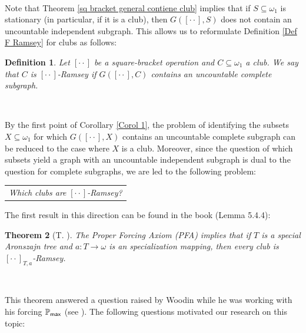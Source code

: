 \documentclass{article}
\newtheorem{theorem}{Theorem}
\newtheorem{definition}[theorem]{Definition}
\begin{document}
\qquad\qquad\qquad\ \ \ 

Note that Theorem \ref{sq bracket general contiene club} implies that if
$S\subseteq\omega_{1}$ is stationary (in particular, if it is a club), then
$G([\cdot\cdot],S)$ does not contain an uncountable independent subgraph. This
allows us to reformulate Definition \ref{Def F Ramsey} for clubs as follows:

\begin{definition}
Let $[\cdot\cdot]$ be a square-bracket operation and $C\subseteq\omega_{1}$ a
club. We say that $C$ is $[\cdot\cdot]$\emph{-Ramsey }if $G([\cdot\cdot],C)$
contains an uncountable complete subgraph.
\end{definition}

\qquad\qquad\qquad\ \ \ \ \qquad\ \ \ 

By the first point of Corollary \ref{Corol 1}, the problem of identifying the
subsets $X\subseteq\omega_{1}$ for which $G([\cdot\cdot],X)$ contains an
uncountable complete subgraph can be reduced to the case where $X$ is a club.
Moreover, since the question of which subsets yield a graph with an
uncountable independent subgraph is dual to the question for complete
subgraphs, we are led to the following problem:\newline

\begin{center}%
\begin{tabular}
[c]{l}%
\emph{Which clubs are}\textit{ }$[\cdot\cdot]$\emph{-Ramsey?}%
\end{tabular}



\end{center}

The first result in this direction can be found in the book \cite{Walks}
(Lemma 5.4.4):

\begin{theorem}
[T. \cite{Walks}]The \emph{Proper Forcing Axiom} (\textsf{PFA}) implies that
if $T$ is a special Aronszajn tree and $a:T\longrightarrow\omega$ is an
specialization mapping, then every club is $[\cdot\cdot]_{T,a}$-Ramsey.
\label{Teorema PFA Aronszajn}
\end{theorem}

\qquad\qquad\qquad\ \ \ \qquad\ 

This theorem answered a question raised by Woodin while he was working with
his forcing $\mathbb{P}_{\text{\textsf{max}}}$ (see \cite{PmaxBook}). The
following questions motivated our research on this topic:
\end{document}
